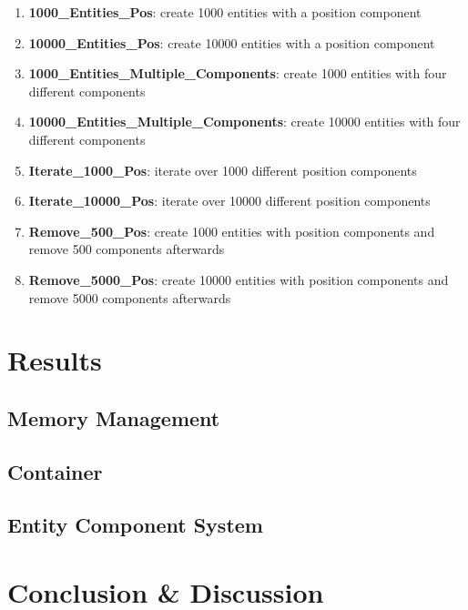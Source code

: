 \begin{enumerate}
	\item \textbf{1000\_Entities\_Pos}: create 1000 entities with a position component
	\item \textbf{10000\_Entities\_Pos}: create 10000 entities with a position component
	
	\item \textbf{1000\_Entities\_Multiple\_Components}: create 1000 entities with four different components
	\item \textbf{10000\_Entities\_Multiple\_Components}: create 10000 entities with four different components
	
	\item \textbf{Iterate\_1000\_Pos}: iterate over 1000 different position components
	\item \textbf{Iterate\_10000\_Pos}: iterate over 10000 different position components
	
	\item \textbf{Remove\_500\_Pos}: create 1000 entities with position components and remove 500 components afterwards
	\item \textbf{Remove\_5000\_Pos}: create 10000 entities with position components and remove 5000 components afterwards
\end{enumerate}

\section{Results}
\blindtext
\subsection{Memory Management}
\blindtext
\subsection{Container}
\blindtext
\subsection{Entity Component System}
\blindtext
\section{Conclusion \& Discussion}
\blindtext